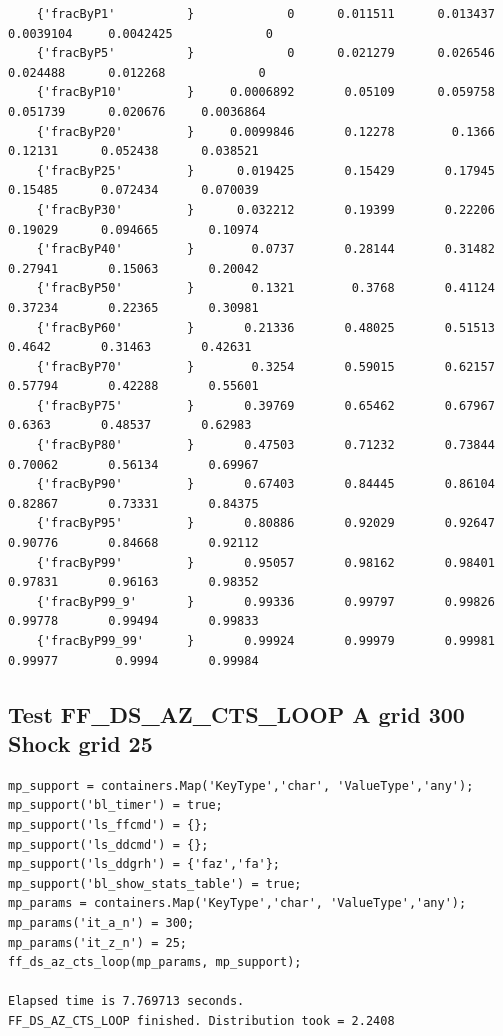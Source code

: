 \documentclass[
]{book}
\begin{document}
\begin{verbatim}
    {'fracByP1'          }             0      0.011511      0.013437     0.0039104     0.0042425             0 
    {'fracByP5'          }             0      0.021279      0.026546      0.024488      0.012268             0 
    {'fracByP10'         }     0.0006892       0.05109      0.059758      0.051739      0.020676     0.0036864 
    {'fracByP20'         }     0.0099846       0.12278        0.1366       0.12131      0.052438      0.038521 
    {'fracByP25'         }      0.019425       0.15429       0.17945       0.15485      0.072434      0.070039 
    {'fracByP30'         }      0.032212       0.19399       0.22206       0.19029      0.094665       0.10974 
    {'fracByP40'         }        0.0737       0.28144       0.31482       0.27941       0.15063       0.20042 
    {'fracByP50'         }        0.1321        0.3768       0.41124       0.37234       0.22365       0.30981 
    {'fracByP60'         }       0.21336       0.48025       0.51513        0.4642       0.31463       0.42631 
    {'fracByP70'         }        0.3254       0.59015       0.62157       0.57794       0.42288       0.55601 
    {'fracByP75'         }       0.39769       0.65462       0.67967        0.6363       0.48537       0.62983 
    {'fracByP80'         }       0.47503       0.71232       0.73844       0.70062       0.56134       0.69967 
    {'fracByP90'         }       0.67403       0.84445       0.86104       0.82867       0.73331       0.84375 
    {'fracByP95'         }       0.80886       0.92029       0.92647       0.90776       0.84668       0.92112 
    {'fracByP99'         }       0.95057       0.98162       0.98401       0.97831       0.96163       0.98352 
    {'fracByP99_9'       }       0.99336       0.99797       0.99826       0.99778       0.99494       0.99833 
    {'fracByP99_99'      }       0.99924       0.99979       0.99981       0.99977        0.9994       0.99984 
\end{verbatim}

\hypertarget{test-ff_ds_az_cts_loop-a-grid-300-shock-grid-25}{%
\subsection{Test FF\_DS\_AZ\_CTS\_LOOP A grid 300 Shock grid 25}\label{test-ff_ds_az_cts_loop-a-grid-300-shock-grid-25}}

\begin{verbatim}
mp_support = containers.Map('KeyType','char', 'ValueType','any');
mp_support('bl_timer') = true;
mp_support('ls_ffcmd') = {};
mp_support('ls_ddcmd') = {};
mp_support('ls_ddgrh') = {'faz','fa'};
mp_support('bl_show_stats_table') = true;
mp_params = containers.Map('KeyType','char', 'ValueType','any');
mp_params('it_a_n') = 300;
mp_params('it_z_n') = 25;
ff_ds_az_cts_loop(mp_params, mp_support);

Elapsed time is 7.769713 seconds.
FF_DS_AZ_CTS_LOOP finished. Distribution took = 2.2408
\end{verbatim}
\end{document}
